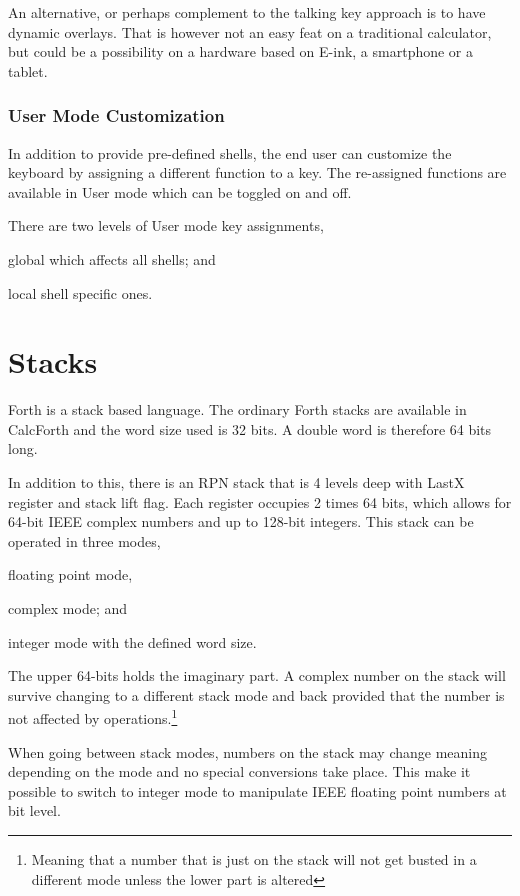 \documentclass[a4paper]{article}
\begin{document}
An alternative, or perhaps complement to the talking key approach is to have dynamic overlays. That is however not an easy feat on a traditional calculator, but could be a possibility on a hardware based on E-ink, a smartphone or a tablet.

\subsubsection{User Mode Customization}
In addition to provide pre-defined shells, the end user can customize the keyboard by assigning a different function to a key. The re-assigned functions are available in User mode which can be toggled on and off.

There are two levels of User mode key assignments,
\begin{inparaenum}
\item global which affects all shells;  and
\item local shell specific ones.
\end{inparaenum}


\section{Stacks}
Forth is a stack based language. The ordinary Forth stacks are available in CalcForth and the word size used is 32 bits. A double word is therefore 64 bits long.

In addition to this, there is an RPN stack that is 4 levels deep with LastX register and stack lift flag.
Each register occupies 2 times 64 bits, which allows for 64-bit IEEE complex numbers and up to 128-bit integers.
This stack can be operated in three modes,
\begin{inparaenum}
\item  floating point mode,
\item complex mode; and
\item integer mode with the defined word size.
\end{inparaenum}

The upper 64-bits holds the imaginary part. A complex number on the stack will survive changing to a different stack mode and back provided that the number is not affected by operations.\footnote{Meaning that a number that is just on the stack will not get busted in a different mode unless the lower part is altered}

When going between stack modes, numbers on the stack may change meaning depending on the mode and no special conversions take place. This make it possible to switch to integer mode to manipulate IEEE floating point numbers at bit level.
\end{document}
